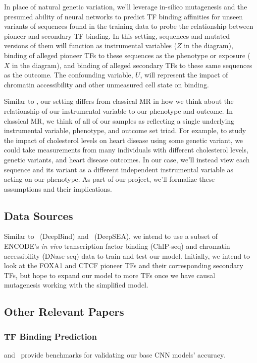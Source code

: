 In place of natural genetic variation, we'll leverage in-silico mutagenesis and the presumed ability of neural networks to predict TF binding affinities for unseen variants of sequences found in the training data to  probe the relationship between pioneer and secondary TF binding. In this setting, sequences and mutated versions of them will function as instrumental variables (\( Z \) in the diagram), binding of alleged pioneer TFs to these sequences as the phenotype or exposure (\( X \) in the diagram), and binding of alleged secondary TFs to these same sequences as the outcome. The confounding variable, \( U \), will represent the impact of chromatin accessibility and other unmeasured cell state on binding.

Similar to \cite{zhao2018statistical}, our setting differs from classical MR in how we think about the relationship of our instrumental variable to our phenotype and outcome.  In classical MR, we think of all of our samples as reflecting a single underlying instrumental variable, phenotype, and outcome set triad. For example, to study the impact of cholesterol levels on heart disease using some genetic variant, we could take measurements from many individuals with different cholesterol levels, genetic variants, and heart disease outcomes. In our case, we'll instead view each sequence and its variant as a different independent instrumental variable as acting on our phenotype. As part of our project, we'll formalize these assumptions and their implications.

\subsection{Data Sources}\label{sec:data}
Similar to~\cite{alipanahi2015predicting} (DeepBind) and~\cite{zhou2015predicting} (DeepSEA), we intend to use a subset of ENCODE's \textit{in vivo} transcription factor binding (ChIP-seq) and chromatin accessibility (DNase-seq) data to train and test our model. Initially, we intend to look at the FOXA1 and CTCF pioneer TFs and their corresponding secondary TFs, but hope to expand our model to more TFs once we have causal mutagenesis working with the simplified model.

\subsection{Other Relevant Papers}
\subsubsection{TF Binding Prediction}
\cite{alipanahi2015predicting} and~\cite{zhou2015predicting} provide benchmarks for validating our base CNN models' accuracy.

